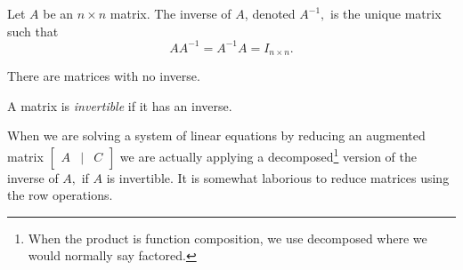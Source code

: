 \begin{definition}
    Let \(A\) be an \(n \times n\) matrix. The inverse of \(A\), denoted \(A^{-1},\) is the unique matrix such that
    \[AA^{-1} = A^{-1}A = I_{n \times n}.\]
\end{definition}

There are matrices with no inverse.

\begin{definition}
    A matrix is \emph{invertible} if it has an inverse.
\end{definition}

When we are solving a system of linear equations by reducing an augmented matrix \(\begin{bmatrix}
    A & \vert & C
\end{bmatrix}\) we are actually applying a decomposed\footnote{When the product is function composition, we use decomposed where we would normally say factored.} version of the inverse of \(A,\) if \(A\) is invertible. It is somewhat laborious to reduce matrices using the row operations.
